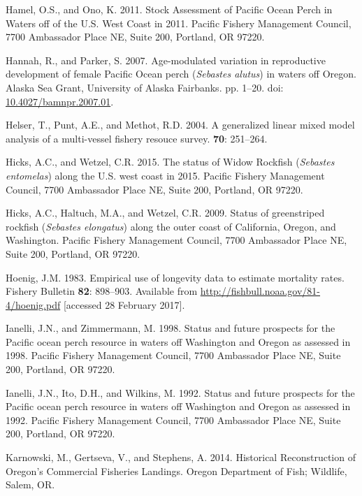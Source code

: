 \documentclass[12pt,]{article}
\begin{document}
\hypertarget{ref-hamel_stock_2011}{}
Hamel, O.S., and Ono, K. 2011. Stock Assessment of Pacific Ocean Perch
in Waters off of the U.S. West Coast in 2011. Pacific Fishery Management
Council, 7700 Ambassador Place NE, Suite 200, Portland, OR 97220.

\hypertarget{ref-hannah_age-modulated_2007}{}
Hannah, R., and Parker, S. 2007. Age-modulated variation in reproductive
development of female Pacific Ocean perch (\emph{Sebastes alutus}) in
waters off Oregon. Alaska Sea Grant, University of Alaska Fairbanks. pp.
1--20. doi:
\href{https://doi.org/10.4027/bamnpr.2007.01}{10.4027/bamnpr.2007.01}.

\hypertarget{ref-helser_generalized_2004}{}
Helser, T., Punt, A.E., and Methot, R.D. 2004. A generalized linear
mixed model analysis of a multi-vessel fishery resouce survey.
\textbf{70}: 251--264.

\hypertarget{ref-hicks_status_2015}{}
Hicks, A.C., and Wetzel, C.R. 2015. The status of Widow Rockfish
(\emph{Sebastes entomelas}) along the U.S. west coast in 2015. Pacific
Fishery Management Council, 7700 Ambassador Place NE, Suite 200,
Portland, OR 97220.

\hypertarget{ref-hicks_status_2009}{}
Hicks, A.C., Haltuch, M.A., and Wetzel, C.R. 2009. Status of
greenstriped rockfish (\emph{Sebastes elongatus}) along the outer coast
of California, Oregon, and Washington. Pacific Fishery Management
Council, 7700 Ambassador Place NE, Suite 200, Portland, OR 97220.

\hypertarget{ref-hoenig_empirical_1983}{}
Hoenig, J.M. 1983. Empirical use of longevity data to estimate mortality
rates. Fishery Bulletin \textbf{82}: 898--903. Available from
\url{http://fishbull.noaa.gov/81-4/hoenig.pdf} {[}accessed 28 February
2017{]}.

\hypertarget{ref-ianelli_status_1998}{}
Ianelli, J.N., and Zimmermann, M. 1998. Status and future prospects for
the Pacific ocean perch resource in waters off Washington and Oregon as
assessed in 1998. Pacific Fishery Management Council, 7700 Ambassador
Place NE, Suite 200, Portland, OR 97220.

\hypertarget{ref-ianelli_status_1992}{}
Ianelli, J.N., Ito, D.H., and Wilkins, M. 1992. Status and future
prospects for the Pacific ocean perch resource in waters off Washington
and Oregon as assessed in 1992. Pacific Fishery Management Council, 7700
Ambassador Place NE, Suite 200, Portland, OR 97220.

\hypertarget{ref-karnowski_historical_2014}{}
Karnowski, M., Gertseva, V., and Stephens, A. 2014. Historical
Reconstruction of Oregon's Commercial Fisheries Landings. Oregon
Department of Fish; Wildlife, Salem, OR.
\end{document}
